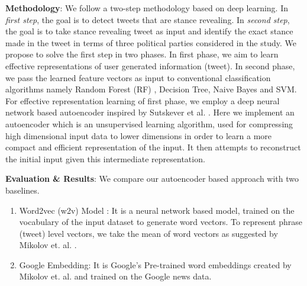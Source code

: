 \documentclass[a4paper,12pt]{article}
\begin{document}
\textbf{Methodology}:
We follow a two-step methodology based on deep learning. 
In \textit{first step}, the goal is to detect tweets that are stance revealing. 
In \textit{second step}, the goal is to take stance revealing tweet as input and identify the exact stance made in the tweet in terms of three political parties considered in the study. 
We propose to solve the first step in two phases. In first phase, we aim to learn effective representations of user generated information (tweet). In second phase, we pass the learned feature vectors as input to conventional classification algorithms namely Random Forest (RF) , Decision Tree, Naive Bayes and SVM. 
For effective representation learning of first phase, we employ a deep neural network based autoencoder inspired by Sutskever et al. \cite{sutskever2014sequence}. %
Here we implement an autoencoder which is an unsupervised learning algorithm, used for compressing high dimensional input data to lower dimensions in order to learn a more compact and efficient representation of the input. It then attempts to reconstruct the initial input given this intermediate representation. 

\textbf{Evaluation \& Results}:
We compare our autoencoder based approach with two baselines.
\begin{enumerate}
    \item Word2vec (w2v) Model \cite{mikolov2013efficient}: It is a neural network based model, trained on the vocabulary of the input dataset to generate word vectors. To represent phrase (tweet) level vectors, we take the mean of word vectors as suggested by Mikolov et. al. \cite{mikolov2013distributed}. 
    \item Google Embedding: It is Google's Pre-trained word embeddings created by Mikolov et. al. \cite{mikolov2013distributed} and trained on the Google news data. 
\end{enumerate}
\end{document}
